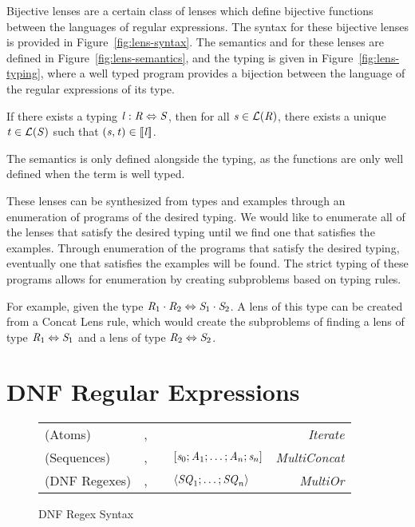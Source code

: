 Bijective lenses are a certain class of lenses which define bijective functions
between the languages of regular expressions.
The syntax for these bijective lenses is provided in Figure~\ref{fig:lens-syntax}.
The semantics and for these lenses are defined in Figure~\ref{fig:lens-semantics},
and the typing is given in Figure~\ref{fig:lens-typing}, where a well
typed program provides a bijection between the language of the regular expressions
of its type.

\begin{theorem}
If there exists a typing $\mathit{l}:\mathit{R}\Leftrightarrow\mathit{S}$, then
for all $\mathit{s}\in\mathcal{L}(\mathit{R})$, there exists a unique
$\mathit{t}\in\mathcal{L}(\mathit{S})$ such that
$(\mathit{s},\mathit{t})\in[ \! [\mathit{l}] \! ]$.
\end{theorem}

The semantics is only defined alongside the typing, as the functions are only
well defined when the term is well typed.

These lenses can be synthesized from types and examples through an enumeration
of programs of the desired typing.
We would like to enumerate all of the lenses that satisfy the desired typing
until we find one that satisfies the examples.
Through enumeration of the programs that satisfy the desired typing, eventually
one that satisfies the examples will be found.
The strict typing of these programs allows for enumeration by creating
subproblems based on typing rules.

For example, given the type $\mathit{R}_1\cdot\mathit{R}_2\Leftrightarrow\mathit{S}_1\cdot\mathit{S}_2$.
A lens of this type can be created from a Concat Lens rule,
which would create the subproblems of finding a lens of type $\mathit{R}_1\Leftrightarrow\mathit{S}_1$
and a lens of type $\mathit{R}_2\Leftrightarrow\mathit{S}_2$.

\section{DNF Regular Expressions}

\begin{figure}
\begin{tabular}{l@{\ }l@{\ }c@{\ }l@{\ }>{\itshape\/}r}

(Atoms)& \Atom{},\AtomAlt{} & \GEq{} & \StarOf{\DNFRegex{}} & Iterate\\
(Sequences)& \Sequence{},\SequenceAlt{} & \GEq{} &
$[\mathit{s}_0;\mathit{A}_1;\ldots;\mathit{A}_n;\mathit{s}_n]$ & MultiConcat\\
(DNF Regexes)& \DNFRegex{},\DNFRegexAlt{} & \GEq{} & $\langle\mathit{SQ}_1;\ldots;\mathit{SQ}_n\rangle$ & MultiOr\\
\end{tabular}
\caption{DNF Regex Syntax} 
\label{fig:dnf-regex-syntax}
\end{figure}

